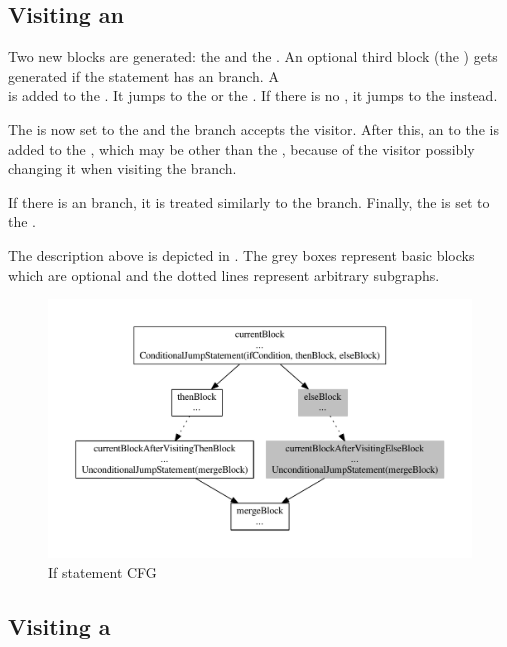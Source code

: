 \subsection{Visiting an }

Two new blocks are generated: the  and the . An optional third block (the
) gets generated if the  statement has an  branch. A\\
 is added to the . It jumps to the  or the
. If there is no , it jumps to the  instead.

The  is now set to the  and the  branch accepts the visitor. After this,
an  to the  is added to the , which may be other
than the , because of the visitor possibly changing it when visiting the  branch.

If there is an  branch, it is treated similarly to the  branch. Finally, the 
is set to the .

The description above is depicted in . The grey boxes represent basic blocks
which are optional and the dotted lines represent arbitrary subgraphs.

\begin{figure}
    \centering
    \includegraphics[width=\textwidth]{src/graph/graph.pdf}
    \caption{If statement CFG\label{img:if-statement}}
\end{figure}

\subsection{Visiting a }

